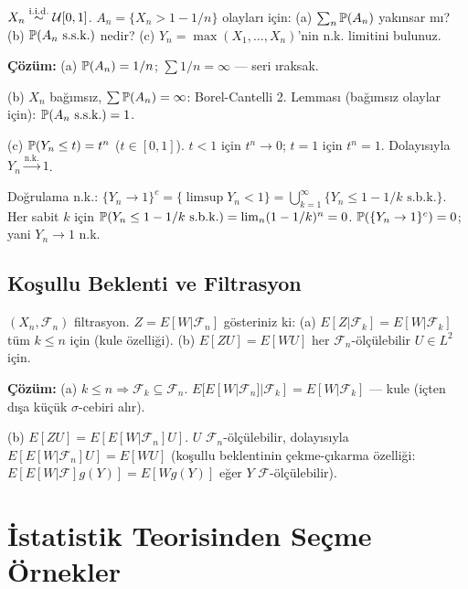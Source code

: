 \begin{ornek}
$X_n\overset{\text{i.i.d.}}{\sim}\mathcal{U}[0,1]$. $A_n=\{X_n>1-1/n\}$ olayları için:
(a) $\sum_n\mathbb{P}(A_n)$ yakınsar mı?
(b) $\mathbb{P}(A_n\text{ s.s.k.})$ nedir?
(c) $Y_n=\max(X_1,\ldots,X_n)$'nin n.k. limitini bulunuz.

\textbf{Çözüm:}
(a) $\mathbb{P}(A_n)=1/n$; $\sum 1/n=\infty$ --- seri ıraksak.

(b) $X_n$ bağımsız, $\sum\mathbb{P}(A_n)=\infty$: Borel-Cantelli 2. Lemması (bağımsız olaylar için): $\mathbb{P}(A_n\text{ s.s.k.})=1$.

(c) $\mathbb{P}(Y_n\leq t)=t^n$ ($t\in[0,1]$). $t<1$ için $t^n\to0$; $t=1$ için $t^n=1$. Dolayısıyla $Y_n\xrightarrow{\text{n.k.}}1$.

Doğrulama n.k.: $\{Y_n\to1\}^c=\{\limsup Y_n<1\}=\bigcup_{k=1}^\infty\{Y_n\leq1-1/k\text{ s.b.k.}\}$. Her sabit $k$ için $\mathbb{P}(Y_n\leq1-1/k\text{ s.b.k.})=\lim_n(1-1/k)^n=0$. $\mathbb{P}(\{Y_n\to1\}^c)=0$; yani $Y_n\to1$ n.k.
\end{ornek}

\subsection{Koşullu Beklenti ve Filtrasyon}

\begin{ornek}
$(X_n,\mathcal{F}_n)$ filtrasyon. $Z=E[W|\mathcal{F}_n]$ gösteriniz ki:
(a) $E[Z|\mathcal{F}_k]=E[W|\mathcal{F}_k]$ tüm $k\leq n$ için (kule özelliği).
(b) $E[ZU]=E[WU]$ her $\mathcal{F}_n$-ölçülebilir $U\in L^2$ için.

\textbf{Çözüm:}
(a) $k\leq n\Rightarrow\mathcal{F}_k\subseteq\mathcal{F}_n$.
$E[E[W|\mathcal{F}_n]|\mathcal{F}_k]=E[W|\mathcal{F}_k]$ --- kule (içten dışa küçük $\sigma$-cebiri alır).

(b) $E[ZU]=E[E[W|\mathcal{F}_n]U]$. $U$ $\mathcal{F}_n$-ölçülebilir, dolayısıyla
$E[E[W|\mathcal{F}_n]U]=E[WU]$ (koşullu beklentinin çekme-çıkarma özelliği: $E[E[W|\mathcal{F}]g(Y)]=E[Wg(Y)]$ eğer $Y$ $\mathcal{F}$-ölçülebilir).
\end{ornek}

\section{İstatistik Teorisinden Seçme Örnekler}
\label{app:istatistik_ornekler}

